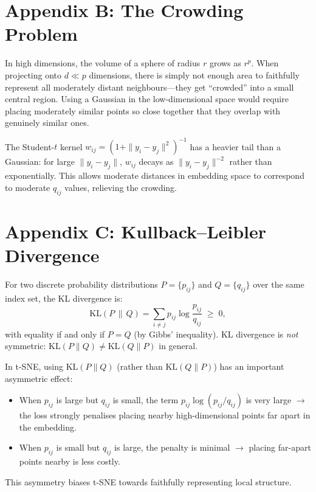 \documentclass[11pt]{article}
\begin{document}
\section*{Appendix B: The Crowding Problem}

In high dimensions, the volume of a sphere of radius $r$ grows as $r^p$.
When projecting onto $d \ll p$ dimensions, there is simply not enough area to
faithfully represent all moderately distant neighbours---they get ``crowded''
into a small central region. Using a Gaussian in the low-dimensional space
would require placing moderately similar points so close together that they
overlap with genuinely similar ones.

The Student-$t$ kernel $w_{ij} = (1+\|y_i-y_j\|^2)^{-1}$ has a heavier tail
than a Gaussian: for large $\|y_i-y_j\|$, $w_{ij}$ decays as
$\|y_i-y_j\|^{-2}$ rather than exponentially. This allows moderate distances
in embedding space to correspond to moderate $q_{ij}$ values, relieving the
crowding.

\section*{Appendix C: Kullback--Leibler Divergence}

For two discrete probability distributions $P = \{p_{ij}\}$ and
$Q = \{q_{ij}\}$ over the same index set, the KL divergence is:
\[
  \mathrm{KL}(P \,\|\, Q)
  = \sum_{i \neq j} p_{ij} \log \frac{p_{ij}}{q_{ij}} \;\geq\; 0,
\]
with equality if and only if $P = Q$ (by Gibbs' inequality). KL divergence is
\emph{not} symmetric: $\mathrm{KL}(P\|Q) \neq \mathrm{KL}(Q\|P)$ in general.

In t-SNE, using $\mathrm{KL}(P\|Q)$ (rather than $\mathrm{KL}(Q\|P)$) has an
important asymmetric effect:
\begin{itemize}
  \item When $p_{ij}$ is large but $q_{ij}$ is small, the term
        $p_{ij}\log(p_{ij}/q_{ij})$ is very large $\to$ the loss strongly
        penalises placing nearby high-dimensional points far apart in the
        embedding.
  \item When $p_{ij}$ is small but $q_{ij}$ is large, the penalty is minimal
        $\to$ placing far-apart points nearby is less costly.
\end{itemize}
This asymmetry biases t-SNE towards faithfully representing local structure.
\end{document}
